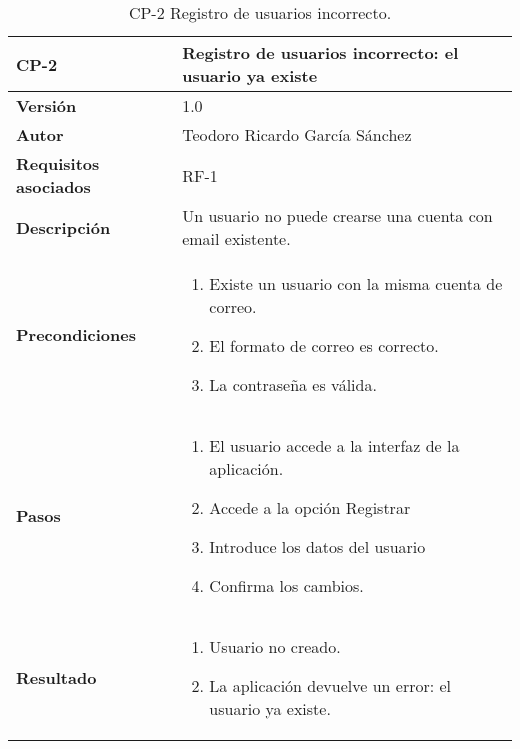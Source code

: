 \begin{table}[p]
	\centering
	\begin{tabularx}{\linewidth}{ p{} p{} }
		\toprule
		\textbf{CP-2}    & \textbf{Registro de usuarios incorrecto: el usuario ya existe}\\
		\toprule
		\textbf{Versión}              & 1.0    \\
		\textbf{Autor}                & Teodoro Ricardo García Sánchez \\
		\textbf{Requisitos asociados} & RF-1 \\
		\textbf{Descripción}          & Un usuario no puede crearse una cuenta con email existente.\\
		\textbf{Precondiciones}       &  
		\begin{enumerate}
			\def\labelenumi{\arabic{enumi}.}
			\tightlist
			\item Existe un usuario con la misma cuenta de correo.
			\item El formato de correo es correcto.
			\item La contraseña es válida.
		\end{enumerate}\\
		\textbf{Pasos}             &
		\begin{enumerate}
			\def\labelenumi{\arabic{enumi}.}
			\tightlist
			\item El usuario accede a la interfaz de la aplicación.
			\item Accede a la opción Registrar
			\item Introduce los datos del usuario
			\item Confirma los cambios.
		\end{enumerate}\\
		\textbf{Resultado}          & 
		\begin{enumerate}
			\item Usuario no creado.
			\item La aplicación devuelve un error: el usuario ya existe.
		\end{enumerate}\\
		\bottomrule
	\end{tabularx}
	\caption{CP-2 Registro de usuarios incorrecto.}
\end{table}

